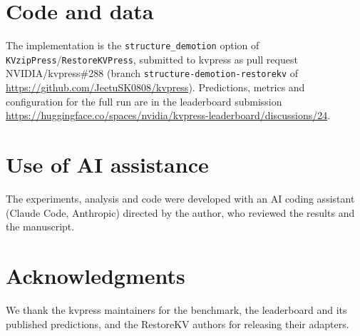 \documentclass[11pt]{article}
\begin{document}
\section*{Code and data}
The implementation is the \texttt{structure\_demotion} option of \texttt{KVzipPress}/\texttt{RestoreKVPress}, submitted to kvpress
as pull request NVIDIA/kvpress\#288 (branch \texttt{structure-demotion-restorekv} of \url{https://github.com/JeetuSK0808/kvpress}).
Predictions, metrics and configuration for the full run are in the leaderboard submission
\url{https://huggingface.co/spaces/nvidia/kvpress-leaderboard/discussions/24}.

\section*{Use of AI assistance}
The experiments, analysis and code were developed with an AI coding assistant (Claude Code, Anthropic) directed by the author, who
reviewed the results and the manuscript.

\section*{Acknowledgments}
We thank the kvpress maintainers for the benchmark, the leaderboard and its published predictions, and the RestoreKV authors for
releasing their adapters.
\end{document}
